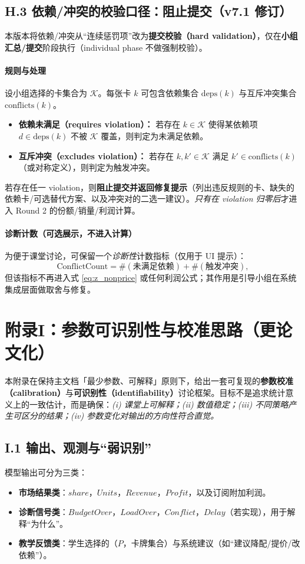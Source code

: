 \documentclass[UTF8,12pt]{ctexart}
\begin{document}
\subsection{H.3 依赖/冲突的校验口径：阻止提交（v7.1 修订）}
本版本将依赖/冲突从“连续惩罚项”改为\textbf{提交校验（hard validation）}，仅在\textbf{小组汇总/提交}阶段执行（individual phase 不做强制校验）。

\paragraph{规则与处理}
设小组选择的卡集合为 $\mathcal{K}$。每张卡 $k$ 可包含依赖集合 $\mathrm{deps}(k)$ 与互斥冲突集合 $\mathrm{conflicts}(k)$。
\begin{itemize}
  \item \textbf{依赖未满足（requires violation）：} 若存在 $k\in\mathcal{K}$ 使得某依赖项 $d\in \mathrm{deps}(k)$ 不被 $\mathcal{K}$ 覆盖，则判定为未满足依赖。
  \item \textbf{互斥冲突（excludes violation）：} 若存在 $k,k'\in\mathcal{K}$ 满足 $k'\in \mathrm{conflicts}(k)$（或对称定义），则判定为触发冲突。
\end{itemize}
若存在任一 violation，则\textbf{阻止提交并返回修复提示}（列出违反规则的卡、缺失的依赖卡/可选替代方案、以及冲突对的二选一建议）。\emph{只有在 violation 归零后}才进入 Round 2 的份额/销量/利润计算。

\paragraph{诊断计数（可选展示，不进入计算）}
为便于课堂讨论，可保留一个\emph{诊断性}计数指标（仅用于 UI 提示）：
\[
\mathrm{ConflictCount}=\#(\text{未满足依赖})+\#(\text{触发冲突}),
\]
但该指标不再进入式 \eqref{eq:z_nonprice} 或任何利润公式；其作用是引导小组在系统集成层面做取舍与修复。
\section{附录I：参数可识别性与校准思路（更论文化）}

本附录在保持主文档「最少参数、可解释」原则下，给出一套可复现的\textbf{参数校准（calibration）}与\textbf{可识别性（identifiability）}讨论框架。目标不是追求统计意义上的一致估计，而是确保：\emph{(i) 课堂上可解释；(ii) 数值稳定；(iii) 不同策略产生可区分的结果；(iv) 参数变化对输出的方向性符合直觉。}

\subsection{I.1 输出、观测与“弱识别”}
模型输出可分为三类：
\begin{itemize}
  \item \textbf{市场结果类}：$share$，$Units$，$Revenue$，$Profit$，以及订阅附加利润。
  \item \textbf{诊断信号类}：$BudgetOver$，$LoadOver$，$Conflict$，$Delay$（若实现），用于解释“为什么”。
  \item \textbf{教学反馈类}：学生选择的（$P$，卡牌集合）与系统建议（如“建议降配/提价/改依赖”）。
\end{itemize}
\end{document}
